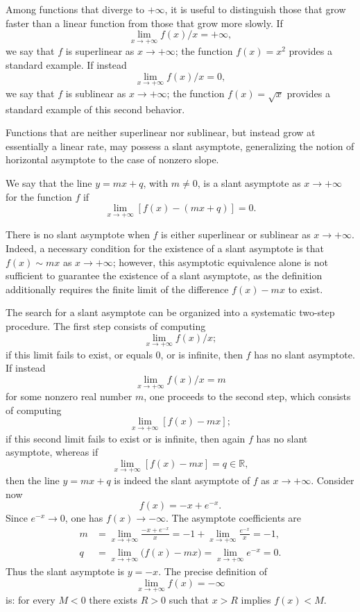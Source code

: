 Among functions that diverge to $+\infty$, it is useful to distinguish those that grow faster than a linear function from those that grow more slowly. If \[
\lim_{x \to +\infty} f(x)/x = +\infty,
\] we say that $f$ is superlinear as $x \to +\infty$; the function $f(x) = x^2$ provides a standard example. If instead \[
\lim_{x \to +\infty} f(x)/x = 0,
\] we say that $f$ is sublinear as $x \to +\infty$; the function $f(x) = \sqrt{x}$ provides a standard example of this second behavior.

Functions that are neither superlinear nor sublinear, but instead grow at essentially a linear rate, may possess a slant asymptote, generalizing the notion of horizontal asymptote to the case of nonzero slope.

\begin{definition}
We say that the line $y = mx + q$, with $m \neq 0$, is a slant asymptote as $x \to +\infty$ for the function $f$ if
\[
\lim_{x \to +\infty} [f(x) - (mx+q)] = 0.
\]

\end{definition}

\begin{remark}
There is no slant asymptote when $f$ is either superlinear or sublinear as $x \to +\infty$. Indeed, a necessary condition for the existence of a slant asymptote is that $f(x) \sim mx$ as $x \to +\infty$; however, this asymptotic equivalence alone is not sufficient to guarantee the existence of a slant asymptote, as the definition additionally requires the finite limit of the difference $f(x) - mx$ to exist.
\end{remark}

The search for a slant asymptote can be organized into a systematic two-step procedure. The first step consists of computing \[
\lim_{x \to +\infty} f(x)/x;
\] if this limit fails to exist, or equals $0$, or is infinite, then $f$ has no slant asymptote. If instead \[
\lim_{x \to +\infty} f(x)/x = m
\] for some nonzero real number $m$, one proceeds to the second step, which consists of computing \[
\lim_{x \to +\infty} [f(x) - mx];
\] if this second limit fails to exist or is infinite, then again $f$ has no slant asymptote, whereas if \[
\lim_{x \to +\infty} [f(x) - mx] = q \in \mathbb{R},
\] then the line $y = mx + q$ is indeed the slant asymptote of $f$ as $x \to +\infty$. Consider now
\[
f(x)=-x+e^{-x}.
\]
Since $e^{-x}\to0$, one has $f(x)\to-\infty$. The asymptote coefficients are
\[
\begin{aligned}
m&=\lim_{x\to+\infty}\frac{-x+e^{-x}}{x}
=-1+\lim_{x\to+\infty}\frac{e^{-x}}{x}=-1,\\
q&=\lim_{x\to+\infty}\bigl(f(x)-mx\bigr)
=\lim_{x\to+\infty}e^{-x}=0.
\end{aligned}
\]
Thus the slant asymptote is $y=-x$. The precise definition of \[
\lim_{x \to +\infty} f(x) = -\infty
\] is: for every $M<0$ there exists $R>0$ such that $x>R$ implies
$f(x)<M$.

